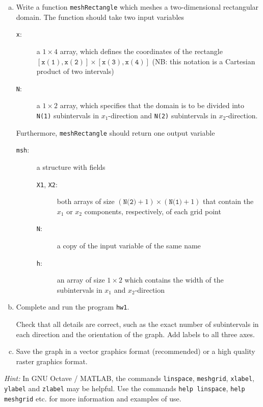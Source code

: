 \documentclass[10pt,letterpaper]{scrartcl}
\begin{document}
\begin{enumerate}[(a)]
\item Write a function \texttt{meshRectangle} which meshes a two-dimensional rectangular domain. The function should take two input variables
\begin{description}
\item[\texttt{x}:] a $1\times 4$ array, which defines the coordinates of the rectangle $\left[ \mathtt{x(1)},\mathtt{x(2)} \right]\times \left[ \mathtt{x(3)},\mathtt{x(4)} \right]$ (NB: this notation is a Cartesian product of two intervals)
\item[\texttt{N}:] a $1 \times 2$ array, which specifies that the domain is to be divided into \texttt{N(1)} subintervals in $x_1$-direction and \texttt{N(2)} subintervals in $x_2$-direction.
\end{description}
Furthermore, \texttt{meshRectangle} should return one output variable
\begin{description}
\item[\texttt{msh}:] a structure with fields
\begin{description}
\item[\texttt{X1}, \texttt{X2}:] both arrays of size $(\texttt{N(2)}+1) \times (\texttt{N(1)}+1)$ that contain the $x_1$ or $x_2$ components, respectively, of each grid point
\item[\texttt{N}:] a copy of the input variable of the same name
\item[\texttt{h}:] an array of size $1 \times 2$ which contains the width of the subintervals in $x_1$ and $x_2$-direction
\end{description}
\end{description}
\item Complete and run the program \texttt{hw1}.

Check that all details are correct, such as the exact number of subintervals in each direction and the orientation of the graph. Add labels to all three axes.
\item \faFilePictureO{} Save the graph in a vector graphics format (recommended) or a high quality raster graphics format.
\end{enumerate}
\emph{Hint:} In \textsf{GNU Octave / MATLAB}, the commands \texttt{linspace}, \texttt{meshgrid}, \texttt{xlabel}, \texttt{ylabel} and \texttt{zlabel} may be helpful. Use the commands \texttt{help linspace}, \texttt{help meshgrid} etc. for more information and examples of use.
\end{document}
